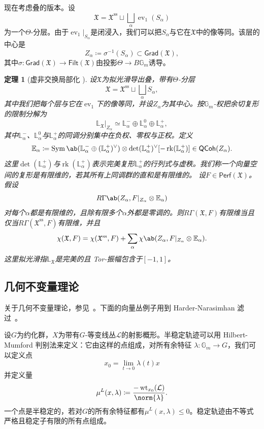 \documentclass{amsart}
\newtheorem{thm}{定理}[section]
\theoremstyle{definition}
\theoremstyle{remark}
\theoremstyle{plain}
\theoremstyle{definition}
\theoremstyle{remark}
\newcommand{\G}{\mathbb{G}}
\newcommand{\E}{\mathbb{E}}
\renewcommand{\L}{\mathbb{L}}
\newcommand{\mc}[1]{\mathcal{#1}}
\newcommand{\mf}[1]{\mathfrak{#1}}
\newcommand{\mr}[1]{\mathrm{#1}}
\newcommand{\on}[1]{\operatorname{#1}}
\newcommand{\ms}[1]{\mathsf{#1}}
\newcommand{\1}{\mathbf{1}}
\newcommand{\2}{\mathbf{2}}
\newcommand{\3}{\mathbf{3}}
\DeclareMathOperator{\ev}{ev}
\begin{document}
现在考虑叠的版本。设
\[
    \mf{X}
    =
    \mf{X}^{\mr{ss}}
    \sqcup
    \bigsqcup_\alpha\ev_1(S_\alpha)
\]
为一个\(\Theta\)-分层。由于\(\ev_1|_{S_\alpha}\)是闭浸入，我们可以把\(S_\alpha\)与它在\(\mf{X}\)中的像等同。该层的中心是
\[
    Z_\alpha\coloneqq\sigma^{-1}(S_\alpha)\subset\ms{Grad}(\mf{X}),
\]
其中\(\sigma\colon\ms{Grad}(\mf{X})\to\ms{Filt}(\mf{X})\)由投影\(\Theta\to B\G_m\)诱导。

\begin{thm}[虚非交换局部化 {\cite[定理~5.1]{HLlocalization}}]
    设\(\mf{X}\)为拟光滑导出叠，带有\(\Theta\)-分层
    \[
        \mf{X}
        =
        \mf{X}^{\mr{ss}}
        \sqcup
        \bigsqcup_\alpha S_\alpha,
    \]
    其中我们把每个层与它在\(\ev_1\)下的像等同，并设\(Z_\alpha\)为其中心。按\(\G_m\)-权把余切复形的限制分解为
    \[
        \L_{\mf{X}}|_{Z_\alpha}
        \simeq
        \L_\alpha^-
        \oplus
        \L_\alpha^0
        \oplus
        \L_\alpha^+,
    \]
    其中\(\L_\alpha^-\)、\(\L_\alpha^0\)与\(\L_\alpha^+\)的同调分别集中在负权、零权与正权。定义
    \[
        \E_\alpha
        \coloneqq
        \on{Sym}\ab(
            \L_\alpha^-
            \oplus
            (\L_\alpha^+)^\vee
        )
        \otimes
        \det(\L_\alpha^+)^\vee
        [-\on{rk}(\L_\alpha^+)]
        \in
        \ms{QCoh}(Z_\alpha).
    \]
    这里\(\det(\L_\alpha^+)\)与\(\on{rk}(\L_\alpha^+)\)表示完美复形\(\L_\alpha^+\)的行列式与虚秩。我们称一个向量空间的复形是有限维的，若其所有上同调群的直和是有限维的。
    设\(F\in\ms{Perf}(\mf{X})\)。假设
    \[
        R\Gamma\ab(
            Z_\alpha,
            F|_{Z_\alpha}\otimes\E_\alpha
        )
    \]
    对每个\(\alpha\)都是有限维的，且除有限多个\(\alpha\)外都是零调的。则\(R\Gamma(\mf{X},F)\)有限维当且仅当\(R\Gamma(\mf{X}^{\mr{ss}},F)\)有限维，并且
    \[
        \chi(\mf{X},F)
        =
        \chi(\mf{X}^{\mr{ss}},F)
        +
        \sum_\alpha
        \chi\ab(
            Z_\alpha,
            F|_{Z_\alpha}\otimes\E_\alpha
        ).
    \]
    这里拟光滑指\(\L_{\mf{X}}\)是完美的且 Tor-振幅包含于\([-1,1]\)。
\end{thm}


\subsection{几何不变量理论}%
\label{sub:Geometric invariant theory}

关于几何不变量理论，参见~\cite{MFK1994}。下面的向量丛例子用到 Harder-Narasimhan 滤过~\cite{HN1975}。

设\(G\)为约化群，\(X\)为带有\(G\)-等变线丛\(\mc{L}\)的射影概形。半稳定轨迹可以用 Hilbert-Mumford 判别法来定义：它由这样的点组成，对所有余特征
\(\lambda \colon \G_m \to G\)，我们可以定义点
\[ x_0 = \lim_{t \to 0} \lambda(t) x \]
并定义量
\[ \mu^L(x, \lambda) \coloneqq \frac{-\on{wt}_{x_0}(\mc{L})}{\norm{\lambda}}. \]
一个点是半稳定的，若对\(G\)的所有余特征都有\(\mu^L(x, \lambda) \leq 0\)。稳定轨迹由不等式严格且稳定子有限的所有点组成。
\end{document}
